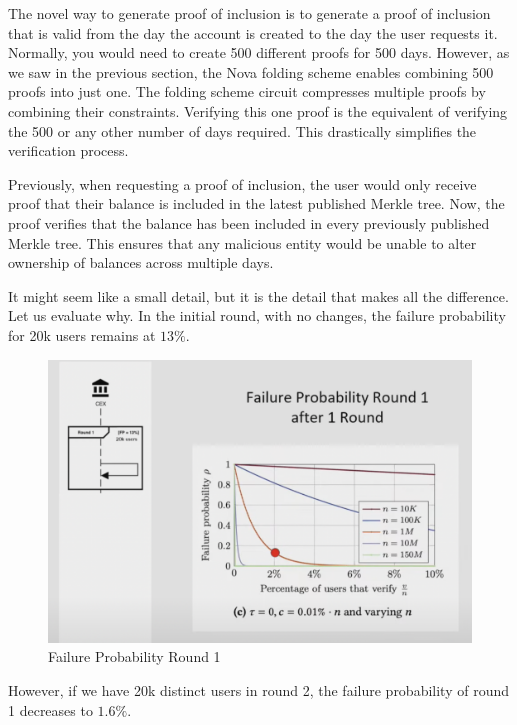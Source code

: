 The novel way to generate proof of inclusion is to generate a proof of inclusion that is valid from the day the account is created to the day the user requests it.
Normally, you would need to create 500 different proofs for 500 days. However, as we saw in the previous section, the Nova folding scheme enables combining 500 proofs into just one.
The folding scheme circuit compresses multiple proofs by combining their constraints.
Verifying this one proof is the equivalent of verifying the 500 or any other number of days required.
This drastically simplifies the verification process.

Previously, when requesting a proof of inclusion, the user would only receive proof that their balance is included in the latest published Merkle tree. Now, the proof verifies that the balance has been included in every previously published Merkle tree. 
This ensures that any malicious entity would be unable to alter ownership of balances across multiple days. 

It might seem like a small detail, but it is the detail that makes all the difference. Let us evaluate why.
In the initial round, with no changes, the failure probability for 20k users remains at $13\%$.

\begin{figure}[H]
   \centering
   \includegraphics[width=130mm]{FailureProbabilityRound1.png}
   \caption{Failure Probability Round 1 \cite{NS23}}
   \label{overflow}
   \end{figure}

However, if we have 20k distinct users in round 2, the failure probability of round 1 decreases to $1.6\%$.

